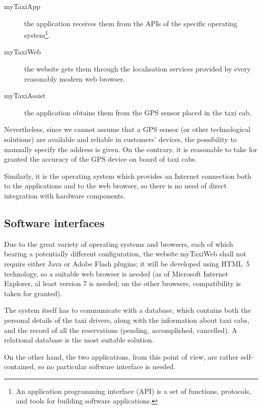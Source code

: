 \begin{description}
	
	\item [myTaxiApp] the application receives them from the APIs of the specific operating system\footnote{An application programming interface (API) is a set of functions, protocols, and tools for building software applications.}.
	
	\item [myTaxiWeb] the website gets them through the localisation services provided by every reasonably modern web browser.
	
	\item [myTaxiAssist] the application obtains them from the GPS sensor placed in the taxi cab.

\end{description}

Nevertheless, since we cannot assume that a GPS sensor (or other technological solutions) are available and reliable in customers' devices, the possibility to manually specify the address is given. On the contrary, it is reasonable to take for granted the accuracy of the GPS device on board of taxi cabs.   

Similarly, it is the operating system which provides an Internet connection both to the applications and to the web browser, so there is no need of direct integration with hardware components.


\subsection{Software interfaces}
Due to the great variety of operating systems and browsers, each of which bearing a potentially different configuration, the website myTaxiWeb shall not require either Java or Adobe Flash plugins; it will be developed using HTML~5 technology, so a suitable web browser is needed (as of Microsoft Internet Explorer, al least version 7 is needed; on the other browsers, compatibility is taken for granted). 

The system itself has to communicate with a database, which contains both the personal details of the taxi drivers, along with the information about taxi cabs, and the record of all the reservations (pending, accomplished, cancelled). A relational database is the most suitable solution.

On the other hand, the two applications, from this point of view, are rather \mbox{self-contained}, so no particular software interface is needed.


